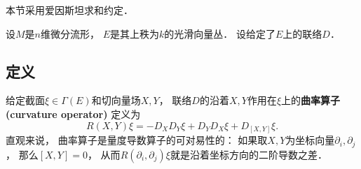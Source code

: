 

本节采用爱因斯坦求和约定．

设$M$是$n$维微分流形， $E$是其上秩为$k$的光滑向量丛． 设给定了$E$上的联络$D$．

\subsection{定义}

给定截面$\xi\in\Gamma(E)$和切向量场$X,Y$， 联络$D$的沿着$X,Y$作用在$\xi$上的\textbf{曲率算子 (curvature operator)} 定义为
$$
R(X,Y)\xi=-D_XD_Y\xi+D_YD_X\xi+D_{[X,Y]}\xi.
$$
直观来说， 曲率算子是量度导数算子的可对易性的： 如果取$X,Y$为坐标向量$\partial_i,\partial_j$， 那么$[X,Y]=0$， 从而$R(\partial_i,\partial_j)\xi$就是沿着坐标方向的二阶导数之差．

